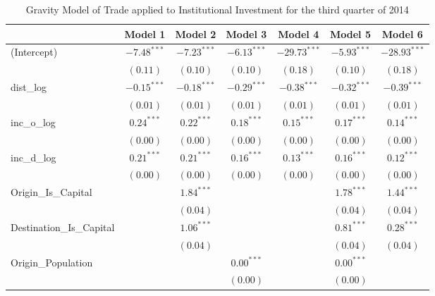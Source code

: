 \begin{table}
	\small
	\caption[Gravity Model of trade for Q3 2014]{Gravity Model of Trade applied to Institutional Investment for the third quarter of 2014}
	\begin{center}
		\begin{tabular}{l c c c c c c }
			\hline
			& Model 1 & Model 2 & Model 3 & Model 4 & Model 5 & Model 6 \\
			\hline
			(Intercept)                  & $-7.48^{***}$ & $-7.23^{***}$ & $-6.13^{***}$ & $-29.73^{***}$ & $-5.93^{***}$ & $-28.93^{***}$ \\
			& $(0.11)$      & $(0.10)$      & $(0.10)$      & $(0.18)$       & $(0.10)$      & $(0.18)$       \\
			dist\_log                    & $-0.15^{***}$ & $-0.18^{***}$ & $-0.29^{***}$ & $-0.38^{***}$  & $-0.32^{***}$ & $-0.39^{***}$  \\
			& $(0.01)$      & $(0.01)$      & $(0.01)$      & $(0.01)$       & $(0.01)$      & $(0.01)$       \\
			inc\_o\_log                  & $0.24^{***}$  & $0.22^{***}$  & $0.18^{***}$  & $0.15^{***}$   & $0.17^{***}$  & $0.14^{***}$   \\
			& $(0.00)$      & $(0.00)$      & $(0.00)$      & $(0.00)$       & $(0.00)$      & $(0.00)$       \\
			inc\_d\_log                  & $0.21^{***}$  & $0.21^{***}$  & $0.16^{***}$  & $0.13^{***}$   & $0.16^{***}$  & $0.12^{***}$   \\
			& $(0.00)$      & $(0.00)$      & $(0.00)$      & $(0.00)$       & $(0.00)$      & $(0.00)$       \\
			Origin\_Is\_Capital          &               & $1.84^{***}$  &               &                & $1.78^{***}$  & $1.44^{***}$   \\
			&               & $(0.04)$      &               &                & $(0.04)$      & $(0.04)$       \\
			Destination\_Is\_Capital     &               & $1.06^{***}$  &               &                & $0.81^{***}$  & $0.28^{***}$   \\
			&               & $(0.04)$      &               &                & $(0.04)$      & $(0.04)$       \\
			Origin\_Population           &               &               & $0.00^{***}$  &                & $0.00^{***}$  &                \\
			&               &               & $(0.00)$      &                & $(0.00)$      &                \\

\end{tabular}
\end{center}
\end{table}
